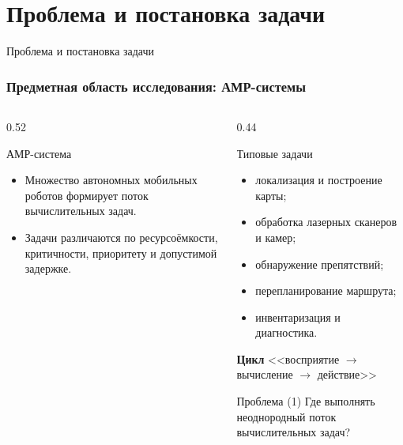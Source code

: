 \section{Проблема и постановка задачи}

\begin{frame}
    \begin{center}
        \Huge Проблема и постановка задачи
    \end{center}
\end{frame}

\begin{frame}
	\frametitle{Предметная область исследования: АМР-системы}
	\small
	\begin{columns}[T,onlytextwidth]
		\begin{column}{0.52\textwidth}
			\begin{block}{АМР-система}
				\begin{center}
				\end{center}
				\begin{itemize}
					\item Множество автономных мобильных роботов формирует поток вычислительных задач.
					\item Задачи различаются по ресурсоёмкости, критичности, приоритету и допустимой задержке.
				\end{itemize}
			\end{block}
		\end{column}
		\begin{column}{0.44\textwidth}
			\begin{block}{Типовые задачи}
				\begin{itemize}
					\item локализация и построение карты;
					\item обработка лазерных сканеров и камер;
					\item обнаружение препятствий;
					\item перепланирование маршрута;
					\item инвентаризация и диагностика.
				\end{itemize}
				\textbf{Цикл} <<восприятие $\rightarrow$ вычисление $\rightarrow$ действие>>
			\end{block}
				\begin{block}{Проблема (1)}
				Где выполнять неоднородный поток вычислительных задач?
			\end{block}
		\end{column}
	\end{columns}
\end{frame}

